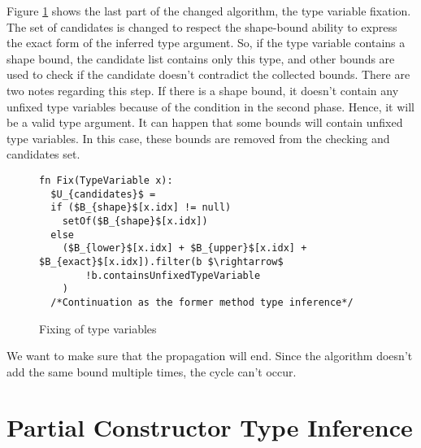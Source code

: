 Figure \ref{img55::mainTypeInference3} shows the last part of the changed algorithm, the type variable fixation. 
The set of candidates is changed to respect the shape-bound ability to express the exact form of the inferred type argument. 
So, if the type variable contains a shape bound, the candidate list contains only this type, and other bounds are used to check if the candidate doesn’t contradict the collected bounds. 
There are two notes regarding this step. 
If there is a shape bound, it doesn’t contain any unfixed type variables because of the condition in the second phase. 
Hence, it will be a valid type argument. It can happen that some bounds will contain unfixed type variables. 
In this case, these bounds are removed from the checking and candidates set.
\begin{figure}[h!]
\begin{lstlisting}[style=myAlgo, mathescape=true]
fn Fix(TypeVariable x):
  $U_{candidates}$ = 
  if ($B_{shape}$[x.idx] != null)
    setOf($B_{shape}$[x.idx])
  else
    ($B_{lower}$[x.idx] + $B_{upper}$[x.idx] + $B_{exact}$[x.idx]).filter(b $\rightarrow$
        !b.containsUnfixedTypeVariable
    )
  /*Continuation as the former method type inference*/
\end{lstlisting}
\caption{Fixing of type variables}
\label{img55::mainTypeInference3}
\end{figure}
\par
\begin{obs}
We want to make sure that the propagation will end.
Since the algorithm doesn't add the same bound multiple times, the cycle can't occur.
\end{obs}

\section{Partial Constructor Type Inference}


